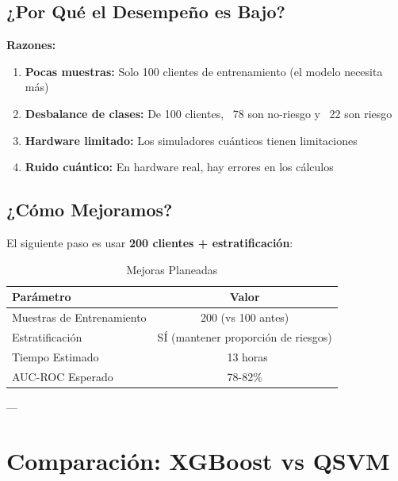 \documentclass[11pt,a4paper,spanish]{article}
\begin{document}
\subsection{¿Por Qué el Desempeño es Bajo?}

\textbf{Razones:}

\begin{enumerate}
    \item \textbf{Pocas muestras:} Solo 100 clientes de entrenamiento (el modelo necesita más)
    
    \item \textbf{Desbalance de clases:} De 100 clientes, ~78 son no-riesgo y ~22 son riesgo
    
    \item \textbf{Hardware limitado:} Los simuladores cuánticos tienen limitaciones
    
    \item \textbf{Ruido cuántico:} En hardware real, hay errores en los cálculos
\end{enumerate}

\subsection{¿Cómo Mejoramos?}

El siguiente paso es usar \textbf{200 clientes + estratificación}:

\begin{table}[H]
\centering
\begin{tabular}{|l|c|}
\hline
\textbf{Parámetro} & \textbf{Valor} \\
\hline
Muestras de Entrenamiento & 200 (vs 100 antes) \\
Estratificación & SÍ (mantener proporción de riesgos) \\
Tiempo Estimado & ~13 horas \\
AUC-ROC Esperado & 78-82\% \\
\hline
\end{tabular}
\caption{Mejoras Planeadas}
\end{table}

---

\section{Comparación: XGBoost vs QSVM}
\end{document}

